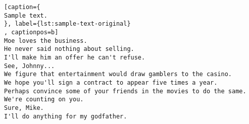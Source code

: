 \begin{lstlisting}[caption={
Sample text.
}, label={lst:sample-text-original}
, captionpos=b]
Moe loves the business.
He never said nothing about selling.
I'll make him an offer he can't refuse.
See, Johnny...
We figure that entertainment would draw gamblers to the casino.
We hope you'll sign a contract to appear five times a year.
Perhaps convince some of your friends in the movies to do the same.
We're counting on you.
Sure, Mike.
I'll do anything for my godfather.
\end{lstlisting}


